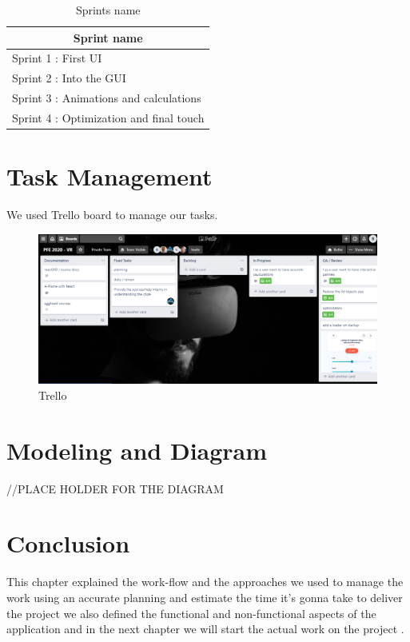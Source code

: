 \documentclass[]{report}
\begin{document}
\begin{table}[H]
	\begin{center}
	\begin{tabular}{|l|}
		\hline
		\multicolumn{1}{|c|}{\textbf{Sprint name}} \\ \hline
		Sprint 1 : First UI                        \\ \hline
		Sprint 2 : Into the GUI                    \\ \hline
		Sprint 3 : Animations and calculations     \\ \hline
		Sprint 4 : Optimization and final touch    \\ \hline
	\end{tabular}
\end{center}
\caption[Sprints name]{Sprints name}
\end{table}

\section{Task Management}
We used Trello board to manage our tasks.

\begin{figure}[H]
	\begin{center}
		\includegraphics[scale=0.5]{Trello.png}
		\caption{Trello}
	\end{center}
\end{figure}

\section{Modeling and Diagram}

//PLACE HOLDER FOR THE DIAGRAM

\section{Conclusion}
This chapter explained the work-flow and the approaches
we used to manage the work using an accurate planning and
estimate the time it’s gonna take to deliver the project we
also defined the functional and non-functional aspects of
the application and in the next chapter we will start the
actual work on the project .
\end{document}

